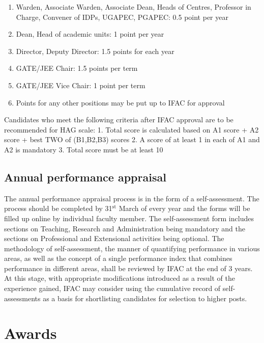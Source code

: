 \documentclass[
  10pt,
  a5paper,
  10pt,
  openany]{amsbook}
\providecommand{\tightlist}{%
  \setlength{\itemsep}{0pt}\setlength{\parskip}{0pt}}
\begin{document}
\begin{itemize}
  \begin{enumerate}
  \def\labelenumi{\arabic{enumi}.}
  \tightlist
  \item
    Warden, Associate Warden, Associate Dean, Heads of Centres,
    Professor in Charge, Convener of IDPs, UGAPEC, PGAPEC: 0.5 point per
    year
  \item
    Dean, Head of academic units: 1 point per year
  \item
    Director, Deputy Director: 1.5 points for each year
  \item
    GATE/JEE Chair: 1.5 points per term
  \item
    GATE/JEE Vice Chair: 1 point per term
  \item
    Points for any other positions may be put up to IFAC for approval
  \end{enumerate}
\end{itemize}

Candidates who meet the following criteria after IFAC approval are to be
recommended for HAG scale: 1. Total score is calculated based on A1
score + A2 score + best TWO of (B1,B2,B3) scores 2. A score of at least
1 in each of A1 and A2 is mandatory 3. Total score must be at least 10

\section{Annual performance
appraisal}\label{annual-performance-appraisal}

The annual performance appraisal process is in the form of a
self-assessment. The process should be completed by 31\(^{\text{st}}\)
March of every year and the forms will be filled up online by individual
faculty member. The self-assessment form includes sections on Teaching,
Research and Administration being mandatory and the sections on
Professional and Extensional activities being optional. The methodology
of self-assessment, the manner of quantifying performance in various
areas, as well as the concept of a single performance index that
combines performance in different areas, shall be reviewed by IFAC at
the end of 3 years. At this stage, with appropriate modifications
introduced as a result of the experience gained, IFAC may consider using
the cumulative record of self-assessments as a basis for shortlisting
candidates for selection to higher posts.

\chapter{Awards}\label{awards}
\end{document}
